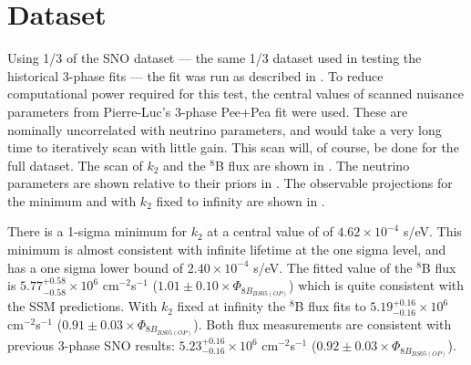 %

\clearpage

\section{ Dataset}
\label{third}

Using 1/3 of the SNO dataset --- the same 1/3 dataset used in testing the historical 3-phase fits --- the fit was run as described in . 
To reduce computational power required for this test, the central values of scanned nuisance parameters from Pierre-Luc's 3-phase Pee+Pea fit were used. 
These are nominally uncorrelated with neutrino parameters, and would take a very long time to iteratively scan with little gain.
This scan will, of course, be done for the full dataset.
The scan of $k_2$ and the $^8$B flux are shown in .
The neutrino parameters are shown relative to their priors in .
The observable projections for the minimum and with $k_2$ fixed to infinity are shown in .

There is a 1-sigma minimum for $k_2$ at a central value of of $4.62\times10^{-4}$ s/eV.
This minimum is almost consistent with infinite lifetime at the one sigma level, and has a one sigma lower bound of $2.40\times10^{-4}$ s/eV.
The fitted value of the $^8$B flux is $5.77^{+0.58}_{-0.58}\times10^6$ cm$^{-2}$s$^{-1}$ ($1.01\pm0.10 \times \Phi_{8B_{BS05(OP)}}$) which is quite consistent with the SSM predictions.
With $k_2$ fixed at infinity the $^8$B flux fits to $5.19^{+0.16}_{-0.16}\times10^6$ cm$^{-2}$s$^{-1}$ ($0.91\pm0.03 \times \Phi_{8B_{BS05(OP)}}$).
Both flux measurements are consistent with previous 3-phase SNO results: $5.23^{+0.16}_{-0.16}\times10^6$ cm$^{-2}$s$^{-1}$ ($0.92\pm0.03 \times \Phi_{8B_{BS05(OP)}}$).

